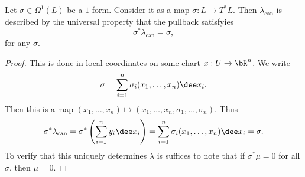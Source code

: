 \begin{prop}
    Let $\sigma\in\Omega^1(L)$ be a $1$-form.
    Consider it as a map $\sigma:L\to T^*L$.
    Then $\lambda_{\mathrm{can}}$ is described by the universal property that the pullback satisfyies
    \[\sigma^*\lambda_{\mathrm{can}}=\sigma,\]
    for any $\sigma$.
\end{prop}

\begin{proof}
    This is done in local coordinates on some chart $x:U\to\bR^n$.
    We write
    \[\sigma=\sum_{i=1}^n\sigma_i(x_1,\ldots,x_n)\dee x_i.\]
    Then this is a map $(x_1,\ldots,x_n)\mapsto(x_1,\ldots,x_n,\sigma_1,\ldots,\sigma_n)$.
    Thus
    \[\sigma^*\lambda_{\mathrm{can}}=\sigma^*\left(\sum_{i=1}^ny_i\dee x_i\right)=\sum_{i=1}^n\sigma_i(x_1,\ldots,x_n)\dee x_i=\sigma.\]
    To verify that this uniquely determines $\lambda$ is suffices to note that if $\sigma^*\mu=0$ for all $\sigma$, then $\mu=0$.
\end{proof}
